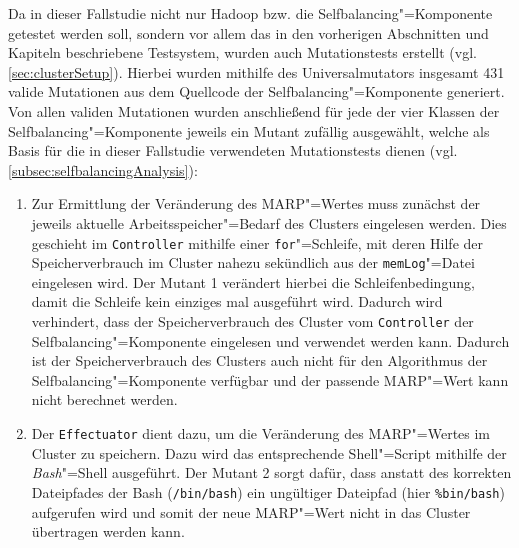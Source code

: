 Da in dieser Fallstudie nicht nur Hadoop bzw. die Selfbalancing"=Komponente getestet werden soll, sondern vor allem das in den vorherigen Abschnitten und Kapiteln beschriebene Testsystem, wurden auch Mutationstests erstellt (vgl. \cref{sec:clusterSetup}).
Hierbei wurden mithilfe des Universalmutators insgesamt 431 valide Mutationen aus dem Quellcode der Selfbalancing"=Komponente generiert.
Von allen validen Mutationen wurden anschließend für jede der vier Klassen der Selfbalancing"=Komponente jeweils ein Mutant zufällig ausgewählt, welche als Basis für die in dieser Fallstudie verwendeten Mutationstests dienen (vgl. \cref{subsec:selfbalancingAnalysis}):

\begin{enumerate}
    \item
    Zur Ermittlung der Veränderung des \gls{MARP}"=Wertes muss zunächst der jeweils aktuelle Arbeitsspeicher"=Bedarf des Clusters eingelesen werden.
    Dies geschieht im \texttt{Controller} mithilfe einer \texttt{for}"=Schleife, mit deren Hilfe der Speicherverbrauch im Cluster nahezu sekündlich aus der \texttt{memLog}"=Datei eingelesen wird.
    Der Mutant 1 verändert hierbei die Schleifenbedingung, damit die Schleife kein einziges mal ausgeführt wird.
    Dadurch wird verhindert, dass der Speicherverbrauch des Cluster vom \texttt{Controller} der Selfbalancing"=Komponente eingelesen und verwendet werden kann.
    Dadurch ist der Speicherverbrauch des Clusters auch nicht für den Algorithmus \cite{Zhang2016} der Selfbalancing"=Komponente verfügbar und der passende \gls{MARP}"=Wert kann nicht berechnet werden.
    
    \item 
    Der \texttt{Effectuator} dient dazu, um die Veränderung des \gls{MARP}"=Wertes im Cluster zu speichern.
    Dazu wird das entsprechende Shell"=Script mithilfe der \emph{Bash}"=Shell ausgeführt.
    Der Mutant 2 sorgt dafür, dass anstatt des korrekten Dateipfades der Bash (\texttt{/bin/bash}) ein ungültiger Dateipfad (hier \texttt{\%bin/bash}) aufgerufen wird und somit der neue \gls{MARP}"=Wert nicht in das Cluster übertragen werden kann.
    

\end{enumerate}
